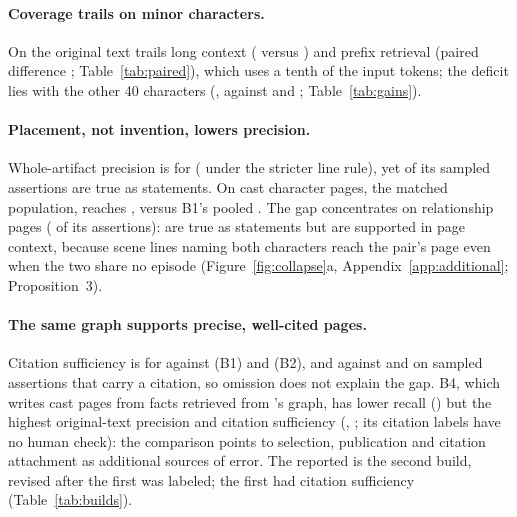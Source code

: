\paragraph{Coverage trails on minor characters.}
On the original text \sys trails long context ( versus
) and prefix retrieval (paired difference
; Table~\ref{tab:paired}), which uses a tenth of the input
tokens; the deficit lies with the other 40 characters (, against
 and ; Table~\ref{tab:gains}).

\paragraph{Placement, not invention, lowers precision.}
Whole-artifact precision is  for \sys ( under the
stricter line rule), yet  of its sampled assertions are true as statements.
On cast character pages, the matched population, \sys reaches ,
versus B1's pooled . The gap concentrates on relationship pages
( of its assertions):  are true as
statements but  are supported in page context, because scene lines
naming both characters reach the pair's page even when the two share no episode
(Figure~\ref{fig:collapse}a, Appendix~\ref{app:additional}; Proposition~3).

\paragraph{The same graph supports precise, well-cited pages.}
Citation sufficiency is  for \sys against  (B1)
and  (B2), and  against  and
 on sampled assertions that carry a citation, so omission does not explain
the gap. B4, which writes cast pages from facts retrieved from \sys's graph, has lower
recall () but the highest original-text precision and citation
sufficiency (, ; its citation labels have no
human check): the comparison points to selection, publication and citation attachment as
additional sources of error. The reported \sys is the second build, revised after the first
was labeled; the first had citation sufficiency  (Table~\ref{tab:builds}).


